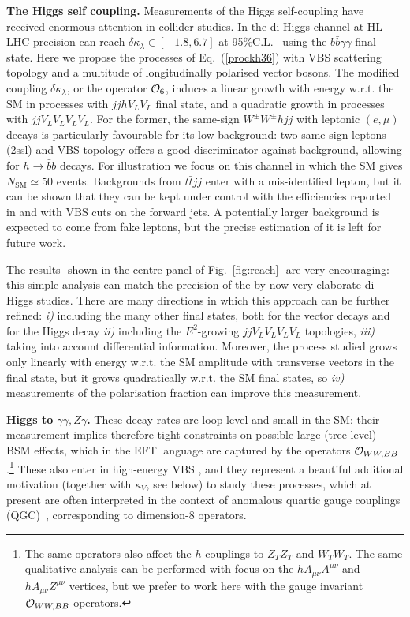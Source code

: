 \vspace{5mm}
\noindent
{\bf The Higgs self coupling.}
Measurements of the Higgs self-coupling have received enormous attention in collider studies.  In the di-Higgs channel at HL-LHC precision can reach $\delta\kappa_\lambda\in[-1.8,6.7]$ at 95\%C.L.~\cite{ATL-PHYS-PUB-2017-001} using the $b\bar{b}\gamma\gamma$ final state. 
Here we propose the processes of Eq.~(\ref{prockh36}) with VBS scattering topology and a  multitude of longitudinally polarised vector bosons.
The modified coupling $\delta \kappa_\lambda$, or the operator $\mathcal{O}_6$, induces a linear growth  with energy w.r.t. the SM in processes with $jj h V_LV_L $ final state, and a quadratic growth in processes with  $jj V_LV_LV_LV_L$. For the former, the same-sign $W^\pm W^\pm h jj$  with leptonic $(e,\mu)$ decays is particularly favourable for its low background: two same-sign leptons (2ssl) and VBS topology offers a good discriminator against background, allowing for $h\to\bar b b$ decays. For illustration we focus on this channel in which the SM gives $N_{\textrm{SM}}\simeq 50$ events. {Backgrounds from $ t \bar t jj$ enter with a mis-identified lepton, but it can be shown that they can be kept under control with the efficiencies reported in \cite{Khachatryan:2015hwa} and with VBS cuts on the forward jets. A potentially larger background is expected to come from fake leptons, but the precise estimation of it is left for future work.}


The results -shown in the centre panel of Fig.~\ref{fig:reach}- are very encouraging: this simple analysis can match the precision of the by-now very elaborate di-Higgs studies.
There are many directions in which this approach can be further refined: \emph{i)} including the  many other final states, both for the vector decays and for the Higgs decay \emph{ii)} including the  $E^2$-growing $jj V_LV_LV_LV_L$ topologies, \emph{iii)} taking into account differential information.
Moreover, the process studied grows only linearly with energy w.r.t. the SM amplitude with transverse vectors in the final state, but it grows quadratically w.r.t. the SM final states, so \emph{iv)} measurements of the polarisation fraction can improve this measurement.



\vspace{5mm}
\noindent
{\bf Higgs to $\gamma\gamma,Z\gamma$.}
These decay rates are loop-level and small in the SM: their measurement implies therefore  tight constraints on possible large (tree-level) BSM effects, which in the EFT language are captured by the operators $\mathcal{O}_{WW,BB}$.\footnote{The same operators also affect the  $h$ couplings to $Z_TZ_T$ and $W_TW_T$. The same qualitative analysis can be performed with focus on the $hA_{\mu\nu}A^{\mu\nu}$ and  $hA_{\mu\nu}Z^{\mu\nu}$ vertices, but we prefer to work here with the gauge invariant $\mathcal{O}_{WW,BB}$ operators.}
These also enter in high-energy VBS , and they represent a beautiful additional motivation (together with $\kappa_V$, see below) to study these processes, which at present are often interpreted in the context of anomalous quartic gauge couplings (QGC)~\cite{Eboli:2006wa}, corresponding to dimension-8 operators.

